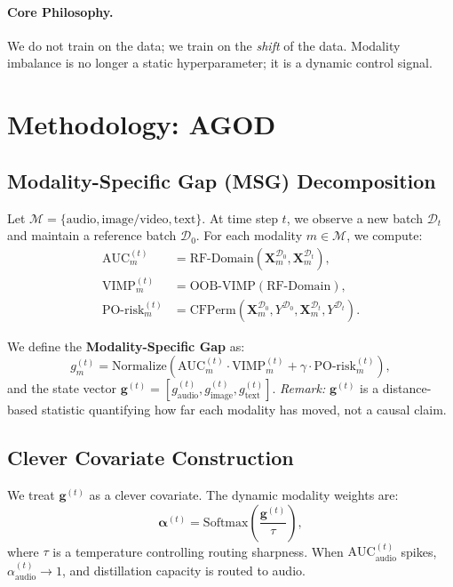 \documentclass[11pt]{article}
\begin{document}
\paragraph{Core Philosophy.}
We do not train on the data; we train on the \emph{shift} of the data. Modality imbalance is no longer a static hyperparameter; it is a dynamic control signal.

\section{Methodology: AGOD}
\label{sec:method}

\subsection{Modality-Specific Gap (MSG) Decomposition}

Let \(\mathcal{M} = \{\text{audio}, \text{image/video}, \text{text}\}\). At time step \(t\), we observe a new batch \(\mathcal{D}_t\) and maintain a reference batch \(\mathcal{D}_0\). For each modality \(m \in \mathcal{M}\), we compute:
\begin{align}
    \text{AUC}_m^{(t)} &= \text{RF-Domain}(\mathbf{X}_m^{\mathcal{D}_0}, \mathbf{X}_m^{\mathcal{D}_t}), \\
    \text{VIMP}_m^{(t)} &= \text{OOB-VIMP}(\text{RF-Domain}), \\
    \text{PO-risk}_m^{(t)} &= \text{CFPerm}(\mathbf{X}_m^{\mathcal{D}_0}, Y^{\mathcal{D}_0}, \mathbf{X}_m^{\mathcal{D}_t}, Y^{\mathcal{D}_t}).
\end{align}

We define the \textbf{Modality-Specific Gap} as:
\begin{equation}
    g_m^{(t)} = \text{Normalize}\left( \text{AUC}_m^{(t)} \cdot \text{VIMP}_m^{(t)} + \gamma \cdot \text{PO-risk}_m^{(t)} \right),
\end{equation}
and the state vector \(\mathbf{g}^{(t)} = [g_{\text{audio}}^{(t)}, g_{\text{image}}^{(t)}, g_{\text{text}}^{(t)}]\).
\textit{Remark:} \(\mathbf{g}^{(t)}\) is a distance-based statistic quantifying how far each modality has moved, not a causal claim.

\subsection{Clever Covariate Construction}

We treat \(\mathbf{g}^{(t)}\) as a clever covariate. The dynamic modality weights are:
\begin{equation}
    \boldsymbol{\alpha}^{(t)} = \text{Softmax}\left( \frac{\mathbf{g}^{(t)}}{\tau} \right),
\end{equation}
where \(\tau\) is a temperature controlling routing sharpness. When \(\text{AUC}_{\text{audio}}^{(t)}\) spikes, \(\alpha_{\text{audio}}^{(t)} \to 1\), and distillation capacity is routed to audio.
\end{document}
